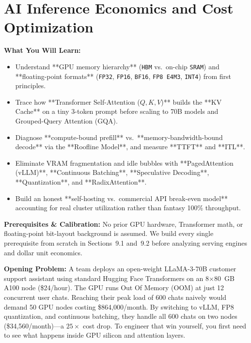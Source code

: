 \chapter{AI Inference Economics and Cost Optimization}
\label{chap:ai-economics}

\begin{chaptergoalsbox}
\textbf{What You Will Learn:}
\begin{itemize}[leftmargin=12pt]
  \item Understand **GPU memory hierarchy** (\texttt{HBM} vs.\ on-chip \texttt{SRAM}) and **floating-point formats** (\texttt{FP32}, \texttt{FP16}, \texttt{BF16}, \texttt{FP8 E4M3}, \texttt{INT4}) from first principles.
  \item Trace how **Transformer Self-Attention ($Q, K, V$)** builds the **KV Cache** on a tiny 3-token prompt before scaling to 70B models and Grouped-Query Attention (GQA).
  \item Diagnose **compute-bound prefill** vs.\ **memory-bandwidth-bound decode** via the **Roofline Model**, and measure **TTFT** and **ITL**.
  \item Eliminate VRAM fragmentation and idle bubbles with **PagedAttention (vLLM)**, **Continuous Batching**, **Speculative Decoding**, **Quantization**, and **RadixAttention**.
  \item Build an honest **self-hosting vs.\ commercial API break-even model** accounting for real cluster utilization rather than fantasy 100\% throughput.
\end{itemize}

\textbf{Prerequisites \& Calibration:}
No prior GPU hardware, Transformer math, or floating-point bit-layout background is assumed. We build every single prerequisite from scratch in Sections~9.1 and~9.2 before analyzing serving engines and dollar unit economics.

\textbf{Opening Problem:}
A team deploys an open-weight LLaMA-3-70B customer support assistant using standard Hugging Face Transformers on an 8$\times$80~GB A100 node (\$24/hour). The GPU runs Out Of Memory (OOM) at just 12 concurrent user chats. Reaching their peak load of 600 chats naively would demand 50 GPU nodes costing \$864,000/month. By switching to vLLM, FP8 quantization, and continuous batching, they handle all 600 chats on two nodes (\$34,560/month)---a $25\times$ cost drop. To engineer that win yourself, you first need to see what happens inside GPU silicon and attention layers.
\end{chaptergoalsbox}


